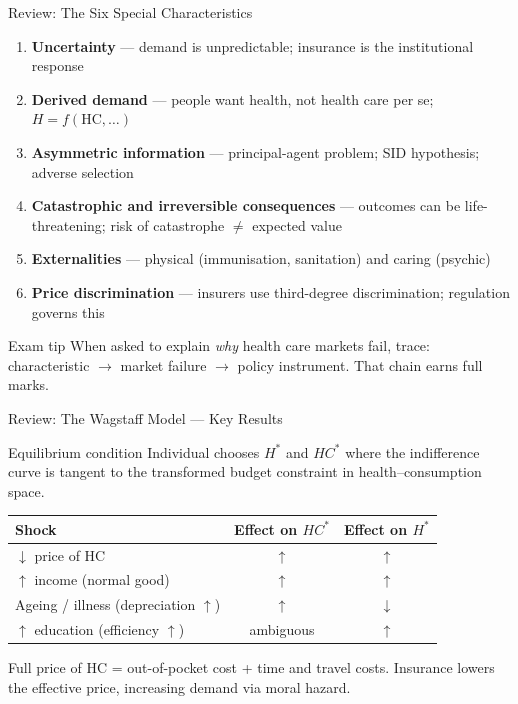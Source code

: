\documentclass[aspectratio=169, 12pt]{beamer}
\begin{document}
\begin{frame}{Review: The Six Special Characteristics}
  \small
  \begin{enumerate}
    \item \textbf{Uncertainty} --- demand is unpredictable; insurance is the institutional response
    \item \textbf{Derived demand} --- people want health, not health care per se; $H = f(\text{HC}, \ldots)$
    \item \textbf{Asymmetric information} --- principal-agent problem; SID hypothesis; adverse selection
    \item \textbf{Catastrophic and irreversible consequences} --- outcomes can be life-threatening; risk of catastrophe $\neq$ expected value
    \item \textbf{Externalities} --- physical (immunisation, sanitation) and caring (psychic)
    \item \textbf{Price discrimination} --- insurers use third-degree discrimination; regulation governs this
  \end{enumerate}
  \vspace{0.15em}
  \begin{alertblock}{Exam tip}
    \footnotesize When asked to explain \emph{why} health care markets fail, trace: characteristic $\rightarrow$ market failure $\rightarrow$ policy instrument. That chain earns full marks.
  \end{alertblock}
\end{frame}

\begin{frame}{Review: The Wagstaff Model --- Key Results}
  \begin{block}{Equilibrium condition}
    Individual chooses $H^*$ and $HC^*$ where the indifference curve is tangent to the
    transformed budget constraint in health--consumption space.
  \end{block}
  \vspace{0.4em}
  \begin{center}
    \begin{tabular}{@{}lcc@{}}
      \toprule
      \textbf{Shock} & \textbf{Effect on $HC^*$} & \textbf{Effect on $H^*$} \\
      \midrule
      $\downarrow$ price of HC & $\uparrow$ & $\uparrow$ \\
      $\uparrow$ income (normal good) & $\uparrow$ & $\uparrow$ \\
      Ageing / illness (depreciation $\uparrow$) & $\uparrow$ & $\downarrow$ \\
      $\uparrow$ education (efficiency $\uparrow$) & ambiguous & $\uparrow$ \\
      \bottomrule
    \end{tabular}
  \end{center}
  \vspace{0.3em}
  {\footnotesize Full price of HC = out-of-pocket cost + time and travel costs.
  Insurance lowers the effective price, increasing demand via moral hazard.}
\end{frame}
\end{document}
